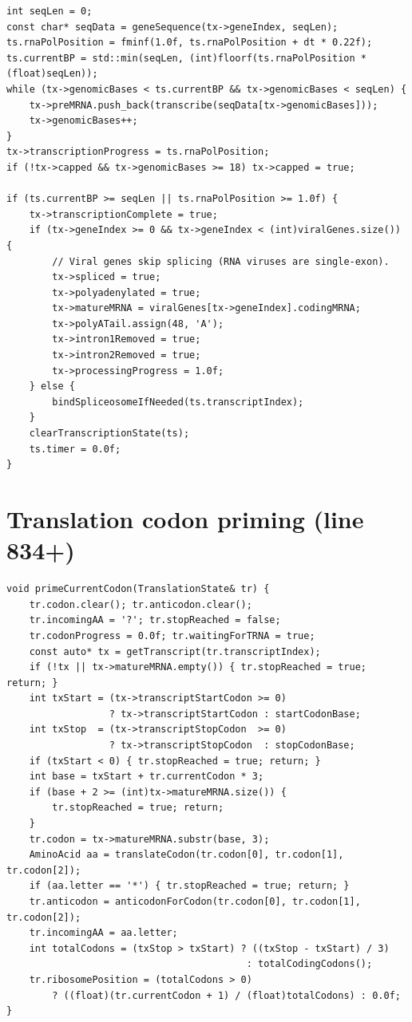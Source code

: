 \documentclass[11pt,letterpaper,twoside,openany]{book}
\begin{document}
\begin{lstlisting}
int seqLen = 0;
const char* seqData = geneSequence(tx->geneIndex, seqLen);
ts.rnaPolPosition = fminf(1.0f, ts.rnaPolPosition + dt * 0.22f);
ts.currentBP = std::min(seqLen, (int)floorf(ts.rnaPolPosition * (float)seqLen));
while (tx->genomicBases < ts.currentBP && tx->genomicBases < seqLen) {
    tx->preMRNA.push_back(transcribe(seqData[tx->genomicBases]));
    tx->genomicBases++;
}
tx->transcriptionProgress = ts.rnaPolPosition;
if (!tx->capped && tx->genomicBases >= 18) tx->capped = true;

if (ts.currentBP >= seqLen || ts.rnaPolPosition >= 1.0f) {
    tx->transcriptionComplete = true;
    if (tx->geneIndex >= 0 && tx->geneIndex < (int)viralGenes.size()) {
        // Viral genes skip splicing (RNA viruses are single-exon).
        tx->spliced = true;
        tx->polyadenylated = true;
        tx->matureMRNA = viralGenes[tx->geneIndex].codingMRNA;
        tx->polyATail.assign(48, 'A');
        tx->intron1Removed = true;
        tx->intron2Removed = true;
        tx->processingProgress = 1.0f;
    } else {
        bindSpliceosomeIfNeeded(ts.transcriptIndex);
    }
    clearTranscriptionState(ts);
    ts.timer = 0.0f;
}
\end{lstlisting}

\section{Translation codon priming (line 834+)}

\begin{lstlisting}
void primeCurrentCodon(TranslationState& tr) {
    tr.codon.clear(); tr.anticodon.clear();
    tr.incomingAA = '?'; tr.stopReached = false;
    tr.codonProgress = 0.0f; tr.waitingForTRNA = true;
    const auto* tx = getTranscript(tr.transcriptIndex);
    if (!tx || tx->matureMRNA.empty()) { tr.stopReached = true; return; }
    int txStart = (tx->transcriptStartCodon >= 0)
                  ? tx->transcriptStartCodon : startCodonBase;
    int txStop  = (tx->transcriptStopCodon  >= 0)
                  ? tx->transcriptStopCodon  : stopCodonBase;
    if (txStart < 0) { tr.stopReached = true; return; }
    int base = txStart + tr.currentCodon * 3;
    if (base + 2 >= (int)tx->matureMRNA.size()) {
        tr.stopReached = true; return;
    }
    tr.codon = tx->matureMRNA.substr(base, 3);
    AminoAcid aa = translateCodon(tr.codon[0], tr.codon[1], tr.codon[2]);
    if (aa.letter == '*') { tr.stopReached = true; return; }
    tr.anticodon = anticodonForCodon(tr.codon[0], tr.codon[1], tr.codon[2]);
    tr.incomingAA = aa.letter;
    int totalCodons = (txStop > txStart) ? ((txStop - txStart) / 3)
                                          : totalCodingCodons();
    tr.ribosomePosition = (totalCodons > 0)
        ? ((float)(tr.currentCodon + 1) / (float)totalCodons) : 0.0f;
}
\end{lstlisting}
\end{document}
